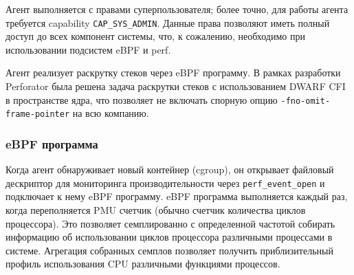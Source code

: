 Агент выполняется с правами суперпользователя; более точно, для работы агента требуется capability \verb!CAP_SYS_ADMIN!.
Данные права позволяют иметь полный доступ до всех компонент системы, что, к сожалению, необходимо при использовании
подсистем eBPF и perf.

Агент реализует раскрутку стеков через eBPF программу.
В рамках разработки Perforator была решена задача раскрутки стеков с использованием DWARF CFI в пространстве ядра,
что позволяет не включать спорную опцию \verb!-fno-omit-frame-pointer! на всю компанию.

\subsubsection{eBPF программа}
Когда агент обнаруживает новый контейнер (cgroup), он открывает файловый дескриптор для мониторинга производительности через
\verb!perf_event_open! и подключает к нему eBPF программу.
eBPF программа выполняется каждый раз, когда переполняется PMU счетчик (обычно счетчик количества циклов процессора).
Это позволяет семплированно с определенной частотой собирать информацию об использовании циклов процессора различными процессами в системе.
Агрегация собранных семплов позволяет получить приблизительный профиль использования CPU различными функциями процессов.


